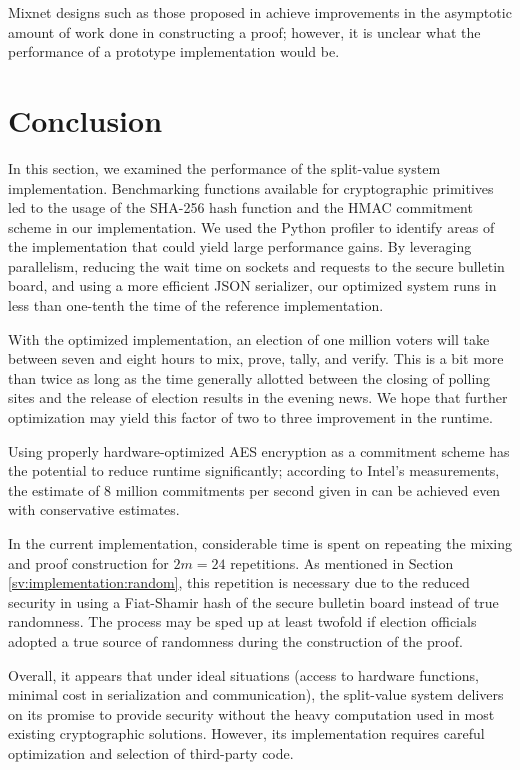 Mixnet designs such as those proposed in \cite{chase13} achieve improvements in the asymptotic amount of work done in constructing a proof; however, it is unclear what the performance of a prototype implementation would be.

\section{Conclusion} \label{perf:conclusion}

In this section, we examined the performance of the split-value system implementation. Benchmarking functions available for cryptographic primitives led to the usage of the SHA-256 hash function and the HMAC commitment scheme in our implementation. We used the Python profiler to identify areas of the implementation that could yield large performance gains. By leveraging parallelism, reducing the wait time on sockets and requests to the secure bulletin board, and using a more efficient JSON serializer, our optimized system runs in less than one-tenth the time of the reference implementation.

With the optimized implementation, an election of one million voters will take between seven and eight hours to mix, prove, tally, and verify. This is a bit more than twice as long as the time generally allotted between the closing of polling sites and the release of election results in the evening news. We hope that further optimization may yield this factor of two to three improvement in the runtime.

Using properly hardware-optimized AES encryption as a commitment scheme has the potential to reduce runtime significantly; according to Intel's measurements, the estimate of 8 million commitments per second given in \cite{rrv} can be achieved even with conservative estimates.

In the current implementation, considerable time is spent on repeating the mixing and proof construction for $2m = 24$ repetitions. As mentioned in Section \ref{sv:implementation:random}, this repetition is necessary due to the reduced security in using a Fiat-Shamir hash of the secure bulletin board instead of true randomness. The process may be sped up at least twofold if election officials adopted a true source of randomness during the construction of the proof.

Overall, it appears that under ideal situations (access to hardware functions, minimal cost in serialization and communication), the split-value system delivers on its promise to provide security without the heavy computation used in most existing cryptographic solutions. However, its implementation requires careful optimization and selection of third-party code.
